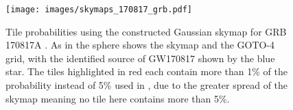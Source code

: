 \begin{colsection}
\begin{colsection}
\begin{figure}[p]
    \begin{center}
        \texttt{[image: images/skymaps\_170817\_grb.pdf]} %
    \end{center}
    \caption[Tile probabilities for GRB 170817A]{
        Tile probabilities using the constructed Gaussian skymap for GRB 170817A \citep{GW170817_Fermi}. As in  the sphere shows the skymap and the GOTO-4 grid, with the identified source of GW170817 shown by the blue star. The tiles highlighted in red each contain more than 1\% of the probability instead of 5\% used in , due to the greater spread of the skymap meaning no tile here contains more than 5\%.
    }\label{fig:170817_grb}
\end{figure}

\end{colsection}


\end{colsection}

